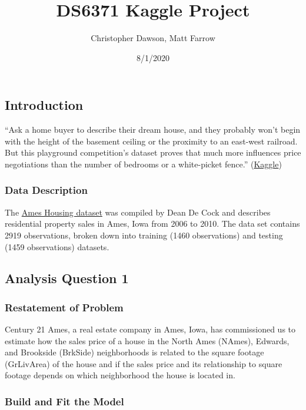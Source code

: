 \documentclass[
]{article}
\title{DS6371 Kaggle Project}
\author{Christopher Dawson, Matt Farrow}
\date{8/1/2020}
\begin{document}
\maketitle

\hypertarget{introduction}{%
\subsection{Introduction}\label{introduction}}

``Ask a home buyer to describe their dream house, and they probably
won't begin with the height of the basement ceiling or the proximity to
an east-west railroad. But this playground competition's dataset proves
that much more influences price negotiations than the number of bedrooms
or a white-picket fence.''
(\href{https://www.kaggle.com/c/house-prices-advanced-regression-techniques/overview}{Kaggle})

\hypertarget{data-description}{%
\subsubsection{Data Description}\label{data-description}}

The \href{http://jse.amstat.org/v19n3/decock.pdf}{Ames Housing dataset}
was compiled by Dean De Cock and describes residential property sales in
Ames, Iowa from 2006 to 2010. The data set contains 2919 observations,
broken down into training (1460 observations) and testing (1459
observations) datasets.

\hypertarget{analysis-question-1}{%
\subsection{Analysis Question 1}\label{analysis-question-1}}

\hypertarget{restatement-of-problem}{%
\subsubsection{Restatement of Problem}\label{restatement-of-problem}}

Century 21 Ames, a real estate company in Ames, Iowa, has commissioned
us to estimate how the sales price of a house in the North Ames (NAmes),
Edwards, and Brookside (BrkSide) neighborhoods is related to the square
footage (GrLivArea) of the house and if the sales price and its
relationship to square footage depends on which neighborhood the house
is located in.

\hypertarget{build-and-fit-the-model}{%
\subsubsection{Build and Fit the Model}\label{build-and-fit-the-model}}
\end{document}
